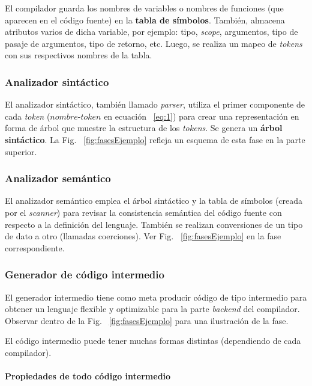     El compilador guarda los nombres de variables o nombres de funciones (que aparecen en el
    código fuente) en la \textbf{tabla de símbolos}. También, almacena atributos 
    varios de dicha variable,
    por ejemplo: tipo, \emph{scope}, argumentos, tipo de pasaje de argumentos, 
    tipo de retorno, etc.
    Luego, se realiza un mapeo de \emph{tokens} con sus respectivos nombres de la tabla.

\subsubsection{Analizador sintáctico}

    El analizador sintáctico, también llamado \emph{parser}, utiliza el primer componente de cada \emph{token} ($nombre\text{-}token$ en ecuación ~\ref{eq:1}) para crear una representación en
    forma de árbol que muestre la estructura de los \emph{tokens}. Se genera un  \textbf{árbol sintáctico}. La Fig. ~\ref{fig:fasesEjemplo} refleja un esquema de esta fase en la parte superior.


\subsubsection{Analizador semántico}

    El analizador semántico emplea el árbol sintáctico y la tabla de símbolos (creada por el \emph{scanner}) para revisar la
    consistencia semántica del código fuente con respecto a la definición del lenguaje. También se realizan conversiones de un tipo de dato a otro (llamadas coerciones).
    Ver Fig. ~\ref{fig:fasesEjemplo} en la fase correspondiente.


\subsubsection{Generador de código intermedio}

    El generador intermedio tiene como meta producir código de tipo intermedio para obtener un lenguaje flexible y optimizable para la
    parte \emph{backend} del compilador. Observar dentro de la Fig. ~\ref{fig:fasesEjemplo} para una ilustración de la fase.

    El código intermedio puede tener muchas formas distintas (dependiendo de cada compilador).

\paragraph*{Propiedades de todo código intermedio}

